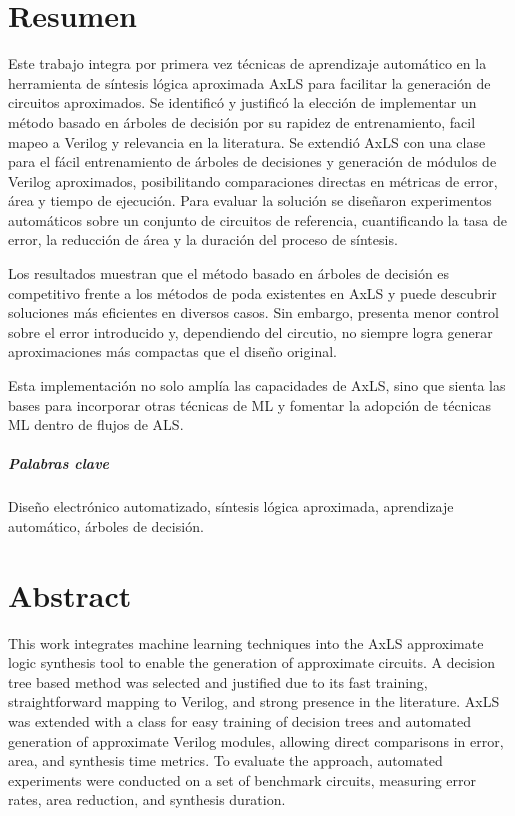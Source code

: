 \chapter*{Resumen}

Este trabajo integra por primera vez técnicas de aprendizaje automático en la
herramienta de síntesis lógica aproximada AxLS para facilitar la generación de
circuitos aproximados. Se identificó y justificó la elección de implementar un
método basado en árboles de decisión por su rapidez de entrenamiento, facil
mapeo a Verilog y relevancia en la literatura. Se extendió AxLS con una clase
para el fácil entrenamiento de árboles de decisiones y generación de módulos de
Verilog aproximados, posibilitando comparaciones directas en métricas de error,
área y tiempo de ejecución. Para evaluar la solución se diseñaron experimentos
automáticos sobre un conjunto de circuitos de referencia, cuantificando la tasa
de error, la reducción de área y la duración del proceso de síntesis.

Los resultados muestran que el método basado en árboles de decisión es
competitivo frente a los métodos de poda existentes en AxLS y puede descubrir
soluciones más eficientes en diversos casos. Sin embargo, presenta menor
control sobre el error introducido y, dependiendo del circutio, no siempre
logra generar aproximaciones más compactas que el diseño original.

Esta implementación no solo amplía las capacidades de AxLS, sino que sienta las
bases para incorporar otras técnicas de ML y fomentar la adopción de técnicas
ML dentro de flujos de ALS.

\paragraph{Palabras clave}

Diseño electrónico automatizado, síntesis lógica aproximada, aprendizaje
automático, árboles de decisión.


\chapter*{Abstract}

This work integrates machine learning techniques into the AxLS approximate
logic synthesis tool to enable the generation of approximate circuits. A
decision tree based method was selected and justified due to its fast training,
straightforward mapping to Verilog, and strong presence in the literature. AxLS
was extended with a class for easy training of decision trees and automated
generation of approximate Verilog modules, allowing direct comparisons in
error, area, and synthesis time metrics. To evaluate the approach, automated
experiments were conducted on a set of benchmark circuits, measuring error
rates, area reduction, and synthesis duration.

